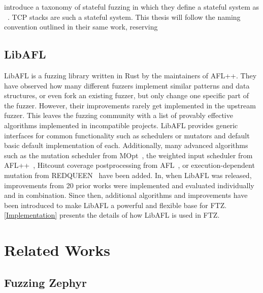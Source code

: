 \documentclass[twocolumn]{article}
\newcommand{\proj}{FTZ\xspace}
\let\savedCite=\cite
\renewcommand{\cite}{\unskip~\savedCite}
\begin{document}
\citeauthor{StatefulReview} introduce a taxonomy of stateful fuzzing in which they define a stateful system as \cite{StatefulReview}. TCP stacks are such a stateful system. This thesis will follow the naming convention outlined in their same work, reserving \cite{StatefulReview}

\subsection{LibAFL}

LibAFL is a fuzzing library written in Rust by the maintainers of AFL++. They have observed how many different fuzzers implement similar patterns and data structures, or even fork an existing fuzzer, but only change one specific part of the fuzzer. However,  their improvements rarely get implemented in the upstream fuzzer. This leaves the fuzzing community with a list of provably effective algorithms implemented in incompatible projects. LibAFL provides generic interfaces for common functionality such as schedulers or mutators and default basic default implementation of each.
Additionally, many advanced algorithms such as the mutation scheduler from MOpt\cite{MOpt}, the weighted input scheduler from AFL++\cite{AFLPlusPlus}, Hitcount coverage postprocessing from AFL\cite{AFL}, or execution-dependent mutation from REDQUEEN\cite{REDQUEEN} have been added. In, when LibAFL was released, improvements from 20 prior works were implemented and evaluated individually and in combination. Since then, additional algorithms and improvements have been introduced to make LibAFL a powerful and flexible base for \proj. \cref{Implementation} presents the details of how LibAFL is used in \proj.\cite{LibAFL}


\section{Related Works}
\label{RelatedWorks}

\subsection{Fuzzing Zephyr}
\end{document}
